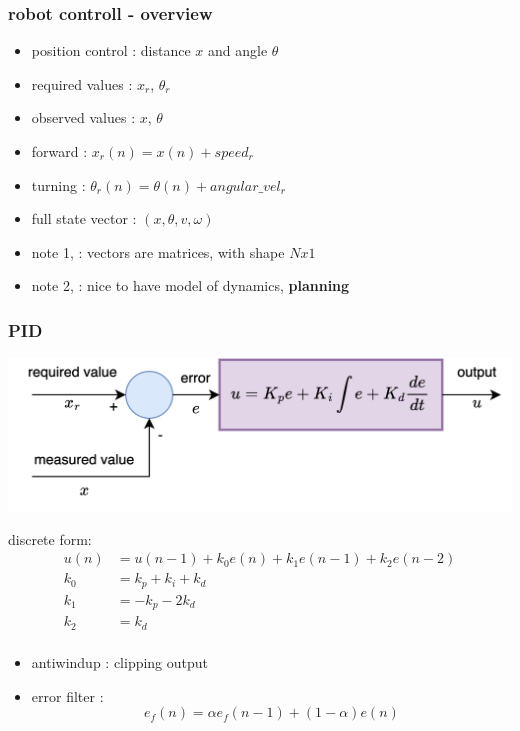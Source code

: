 \documentclass{beamer}
\begin{document}
\begin{frame}
  \frametitle{\bf robot controll - overview}

  \begin{itemize}
    \item position control : distance $x$ and angle $\theta$
    \item required values : $x_r$, $\theta_r$
    \item observed values : $x$, $\theta$ 
    \item forward  : $x_r(n) = x(n) + speed_{r}$
    \item turning  : $\theta_r(n) = \theta(n) + angular\_vel_{r}$
    \item full state vector : $(x, \theta, v, \omega)$
    \item note 1, : vectors are matrices, with shape $N x 1$
    \item note 2, : nice to have model of dynamics, \bf{planning}
  \end{itemize}

\end{frame}




\begin{frame}
  \frametitle{\bf PID}

  {\centering \includegraphics[scale=0.8]{../diagrams/controll/control-pid.png}}

  discrete form: 
  \begin{align*}
    u(n) &= u(n-1) + k_0e(n) + k_1e(n-1) + k_2e(n-2) \\
    k_0  &= k_p + k_i + k_d \\
    k_1  &=-k_p - 2k_d \\
    k_2  &= k_d \\
  \end{align*}
  
  \begin{itemize}
    \item antiwindup   : clipping output 
    \item error filter : $$e_f(n) = \alpha e_f(n-1) + (1 - \alpha)e(n)$$
  \end{itemize}

\end{frame}
\end{document}
